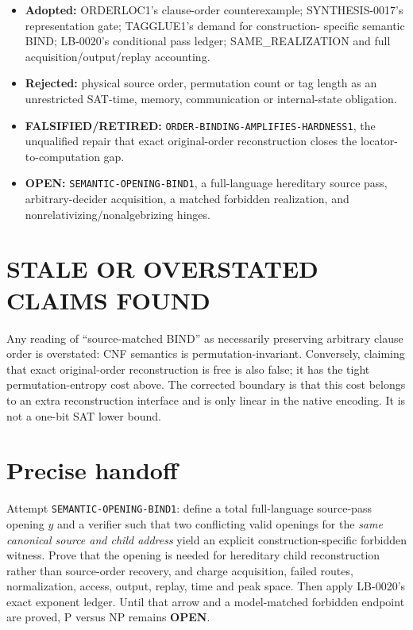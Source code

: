 \documentclass[11pt]{article}
\newcommand{\OPEN}{\textbf{OPEN}}
\begin{document}
\begin{itemize}[leftmargin=1.6em]
\item \textbf{Adopted:} ORDERLOC1's clause-order counterexample;
SYNTHESIS-0017's representation gate; TAGGLUE1's demand for construction-
specific semantic BIND; LB-0020's conditional pass ledger; SAME\_REALIZATION
and full acquisition/output/replay accounting.
\item \textbf{Rejected:} physical source order, permutation count or tag
length as an unrestricted SAT-time, memory, communication or internal-state
obligation.
\item \textbf{FALSIFIED/RETIRED:}
\texttt{ORDER-BINDING-AMPLIFIES-HARDNESS1}, the unqualified repair that exact
original-order reconstruction closes the locator-to-computation gap.
\item \textbf{OPEN:} \texttt{SEMANTIC-OPENING-BIND1}, a full-language
hereditary source pass, arbitrary-decider acquisition, a matched forbidden
realization, and nonrelativizing/nonalgebrizing hinges.
\end{itemize}

\section{STALE OR OVERSTATED CLAIMS FOUND}

Any reading of ``source-matched BIND'' as necessarily preserving arbitrary
clause order is overstated: CNF semantics is permutation-invariant.  Conversely,
claiming that exact original-order reconstruction is free is also false; it
has the tight permutation-entropy cost above.  The corrected boundary is that
this cost belongs to an extra reconstruction interface and is only linear in
the native encoding.  It is not a one-bit SAT lower bound.

\section{Precise handoff}

Attempt \texttt{SEMANTIC-OPENING-BIND1}: define a total full-language
source-pass opening $y$ and a verifier such that two conflicting valid
openings for the \emph{same canonical source and child address} yield an
explicit construction-specific forbidden witness.  Prove that the opening is
needed for hereditary child reconstruction rather than source-order recovery,
and charge acquisition, failed routes, normalization, access, output, replay,
time and peak space.  Then apply LB-0020's exact exponent ledger.  Until that
arrow and a model-matched forbidden endpoint are proved, P versus NP remains
\OPEN.
\end{document}
